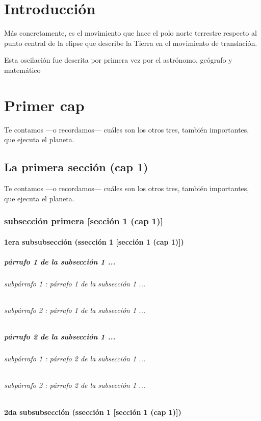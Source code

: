 \documentclass[12pt,a4paper]{report}
\begin{document}
\tableofcontents

\newpage
\listoffigures
\newpage

\begingroup
\renewcommand*{\addvspace}[1]{}
\listoftables
\endgroup


\chapter*{Introducción}
Más concretamente, es el movimiento que hace el polo norte terrestre respecto al punto central de la elipse 
que describe la Tierra en el movimiento de translación.

Esta oscilación fue descrita por primera vez por el astrónomo, geógrafo y matemático

\chapter{Primer cap}
Te contamos —o recordamos— cuáles son los otros tres, también importantes, que ejecuta el planeta.
\section{La primera sección (cap 1)}
Te contamos —o recordamos— cuáles son los otros tres, también importantes, que ejecuta el planeta.
\subsection{subsección primera [sección 1 (cap 1)]}
\subsubsection{1era subsubsección (ssección 1 [sección 1 (cap 1)])}
\paragraph{párrafo 1 de la subsección 1 ...}
\subparagraph{subpárrafo 1 : párrafo 1 de la subsección 1 ...}
\subparagraph{subpárrafo 2 : párrafo 1 de la subsección 1 ...}
\paragraph{párrafo 2 de la subsección 1 ...}
\subparagraph{subpárrafo 1 : párrafo 2 de la subsección 1 ...}
\subparagraph{subpárrafo 2 : párrafo 2 de la subsección 1 ...}
\subsubsection{2da subsubsección (ssección 1 [sección 1 (cap 1)])}
\end{document}
